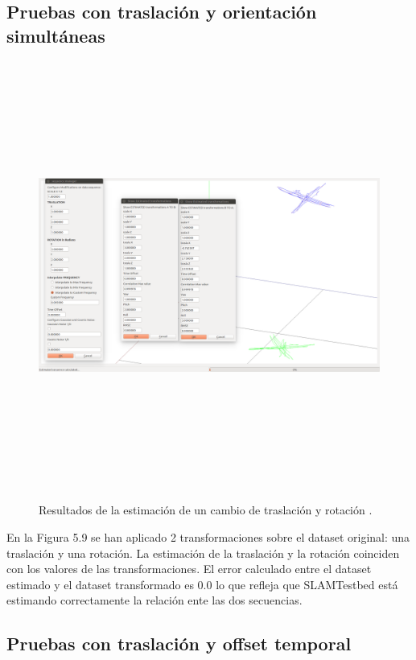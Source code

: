 \subsection{Pruebas con traslación y orientación simultáneas}
\begin{figure}[H]
\begin{center}
\label{fig:opciones de View}\includegraphics[height=14.0cm,width=18.0cm]{img/cap6/Trasla_Rota_abba.png}
\hspace{0.5cm}

\end{center}

\caption{Resultados de la estimación de un cambio de traslación y rotación .}
\end{figure}

En la Figura 5.9 se han aplicado 2 transformaciones sobre el dataset original: una traslación y una rotación.
La estimación de la traslación y la rotación coinciden con los valores de las transformaciones. El error calculado entre el dataset estimado y el dataset transformado es 0.0 lo que refleja que SLAMTestbed está estimando correctamente la relación ente las dos secuencias.

\subsection{Pruebas con traslación y offset temporal}

